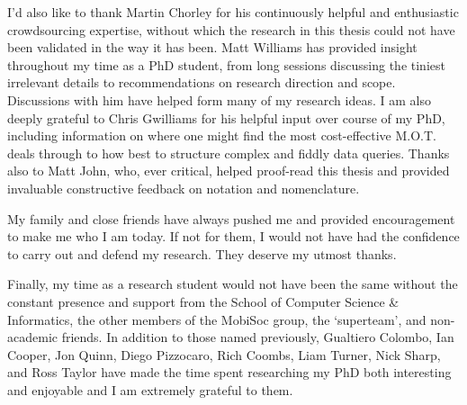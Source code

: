 I'd also like to thank Martin Chorley for his continuously helpful and enthusiastic crowdsourcing expertise, without which the research in this thesis could not have been validated in the way it has been. Matt Williams has provided insight throughout my time as a PhD student, from long sessions discussing the tiniest irrelevant details to recommendations on research direction and scope. Discussions with him have helped form many of my research ideas. I am also deeply grateful to Chris Gwilliams for his helpful input over course of my PhD, including information on where one might find the most cost-effective M.O.T. deals through to how best to structure complex and fiddly data queries. Thanks also to Matt John, who, ever critical, helped proof-read this thesis and provided invaluable constructive feedback on notation and nomenclature.

My family and close friends have always pushed me and provided encouragement to make me who I am today. If not for them, I would not have had the confidence to carry out and defend my research. They deserve my utmost thanks.

Finally, my time as a research student would not have been the same without the constant presence and support from the School of Computer Science \& Informatics, the other members of the MobiSoc group, the `superteam', and non-academic friends. In addition to those named previously, Gualtiero Colombo, Ian Cooper, Jon Quinn, Diego Pizzocaro, Rich Coombs, Liam Turner, Nick Sharp, and Ross Taylor have made the time spent researching my PhD both interesting and enjoyable and I am extremely grateful to them.





